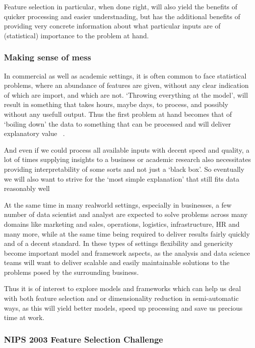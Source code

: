 \documentclass[12pt]{article}
\begin{document}
Feature selection in particular, when done right, will also yield the benefits of quicker processing and easier understnading, but has the additional benefits of providing very concrete information about what particular inputs are of (statistical) importance to the problem at hand.

\subsubsection{Making sense of mess}

In commercial as well as academic settings, it is often common to face statistical problems, where an abundance of features are given, without any clear indication of which are import, and which are not. `Throwing everything at the model', will result in something that takes hours, maybe days, to process, and possibly without any usefull output. Thus the first problem at hand becomes that of `boiling down' the data to something that can be processed and will deliver explanatory value ~\cite{mboostintro}.

And even if we could process all available inputs with decent speed and quality, a lot of times supplying insights to a business or academic research also necessitates providing interpretability of some sorts and not just a `black box'. So eventually we will also want to strive for the `most simple explanation' that still fits data reasonably well ~\cite{wiki:occam}

At the same time in many realworld settings, especially in businesses, a few number of data scientist and analyst are expected to solve problems across many domains like marketing and sales, operations, logistics, infrastructure, HR and many more, while at the same time being required to deliver results fairly quickly and of a decent standard. In these types of settings flexibility and genericity become important model and framework aspects, as the analysis and data science teams will want to deliver scalable and easily maintainable solutions to the problems posed by the surrounding business.

Thus it is of interest to explore models and frameworks which can help us deal with both feature selection and or dimensionality reduction in semi-automatic ways, as this will yield better models, speed up processing and save us precious time at work.

\subsubsection{NIPS 2003 Feature Selection Challenge}
\end{document}
